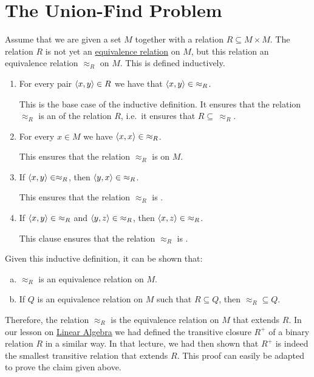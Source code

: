 \section{The Union-Find Problem}
Assume that we are given a set $M$ together with a relation $R \subseteq M \times M$.  The relation
$R$ is not yet an  \href{https://en.wikipedia.org/wiki/Equivalence_relation}{equivalence relation} on $M$, but
this relation  an equivalence relation $\approx_R$ on $M$.  This
 is defined inductively. 
\begin{enumerate}
\item For every pair $\pair(x,y) \in R$ we have that $\pair(x, y) \in\; \approx_R$.

      This is the base case of the inductive definition.  It ensures that the relation
      $\approx_R$ is an  of the relation $R$, i.e.~it ensures that $R \subseteq\, \approx_R$.
\item For every $x \in M$ we have $\pair(x,x) \in\; \approx_R$.

      This ensures that the relation $\approx_R$ is  on $M$.
\item If $\pair(x,y) \in \approx_R$, then $\pair(y,x) \in\; \approx_R$.

      This  ensures that the relation $\approx_R$ is .
\item If $\pair(x,y) \in\; \approx_R$ and $\pair(y,z) \in\; \approx_R$, then $\pair(x,z) \in\; \approx_R$.

      This clause ensures that the relation $\approx_R$ is .
\end{enumerate}
Given this inductive definition, it can be shown that:
\begin{enumerate}[(a)]
\item $\approx_R$ is an equivalence relation on $M$.
\item If $Q$ is an equivalence relation on $M$ such that $R \subseteq Q$, then $\approx_R \subseteq Q$.
\end{enumerate}
Therefore, the relation $\approx_R$ is the 
equivalence relation on $M$ that extends $R$.  In our lesson on
\href{https://github.com/karlstroetmann/Lineare-Algebra/blob/master/Skript/lineare-algebra.pdf}{Linear Algebra}
we had defined the transitive closure $R^+$ of a binary relation $R$ in a similar way.  In 
that lecture, we had then shown that $R^+$ is indeed the smallest transitive relation that extends
$R$.  This proof can easily be adapted to prove the claim given above.

